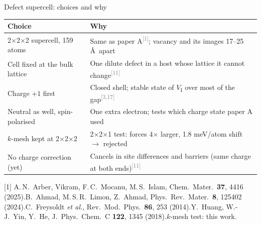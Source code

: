 \documentclass[aspectratio=169,10pt]{beamer}
\newcommand{\cit}[1]{\textsuperscript{\textcolor{gray}{[#1]}}}
\newcommand{\refs}[1]{\par\vfill\begingroup\tiny\color{gray}\raggedright #1\par\endgroup}
\newcommand{\RA}{[1] A.\,N.~Arber, Vikram, F.\,C.~Mocanu, M.\,S.~Islam, Chem.\ Mater.\ \textbf{37}, 4416 (2025).}
\newcommand{\RC}{[3] B.~Ahmad, M.\,S.\,R.~Limon, Z.~Ahmad, Phys.\ Rev.\ Mater.\ \textbf{8}, 125402 (2024).}
\newcommand{\RM}{[11] C.~Freysoldt \emph{et al.}, Rev.\ Mod.\ Phys.\ \textbf{86}, 253 (2014).}
\newcommand{\RS}{[17] Y.~Huang, W.-J.~Yin, Y.~He, J.\ Phys.\ Chem.\ C \textbf{122}, 1345 (2018).}
\begin{document}
\begin{frame}{Defect supercell: choices and why}
  \footnotesize
  \begin{tabular}{p{}p{}}
    \toprule
    Choice & Why \\
    \midrule
    2$\times$2$\times$2 supercell, 159 atoms & Same as paper A\cit{1}; vacancy and its images 17--25 \AA\ apart \\
    Cell fixed at the bulk lattice & One dilute defect in a host whose lattice it cannot change\cit{11} \\
    Charge $+1$ first & Closed shell; stable state of $V_\mathrm{I}$ over most of the gap\cit{3,17} \\
    Neutral as well, spin-polarised & One extra electron; tests which charge state paper A used \\
    $k$-mesh kept at 2$\times$2$\times$2 & 2$\times$2$\times$1 test: forces 4$\times$ larger, 1.8 meV/atom shift $\rightarrow$ rejected \\
    No charge correction (yet) & Cancels in site differences and barriers (same charge at both ends)\cit{11} \\
    \bottomrule
  \end{tabular}
  \refs{\RA\quad \RC\quad \RM\quad \RS\quad $k$-mesh test: this work.}
\end{frame}
\end{document}
